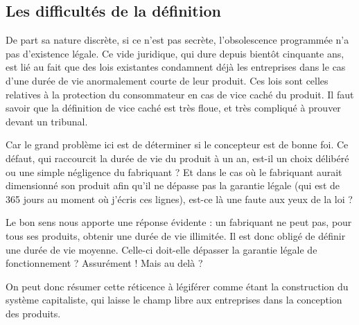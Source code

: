 \subsection{Les difficultés de la définition}

De part sa nature discrète, si ce n'est pas secrète, l'obsolescence programmée n'a pas d'existence légale. Ce vide juridique, qui dure depuis bientôt cinquante ans, est lié au fait que des lois existantes condamnent déjà les entreprises dans le cas d'une durée de vie anormalement courte de leur produit. Ces lois sont celles relatives à la protection du consommateur en cas de vice caché du produit. Il faut savoir que la définition de vice caché est très floue, et très compliqué à prouver devant un tribunal.

Car le grand problème ici est de déterminer si le concepteur est de bonne foi. Ce défaut, qui raccourcit la durée de vie du produit à un an, est-il un choix délibéré ou une simple négligence du fabriquant ? Et dans le cas où le fabriquant aurait dimensionné son produit afin qu'il ne dépasse pas la garantie légale (qui est de 365 jours au moment où j'écris ces lignes), est-ce là une faute aux yeux de la loi ?

Le bon sens nous apporte une réponse évidente : un fabriquant ne peut pas, pour tous ses produits, obtenir une durée de vie illimitée. Il est donc obligé de définir une durée de vie moyenne. Celle-ci doit-elle dépasser la garantie légale de fonctionnement ? Assurément ! Mais au delà ?

On peut donc résumer cette réticence à légiférer comme étant la construction du système capitaliste, qui laisse le champ libre aux entreprises dans la conception des produits.
